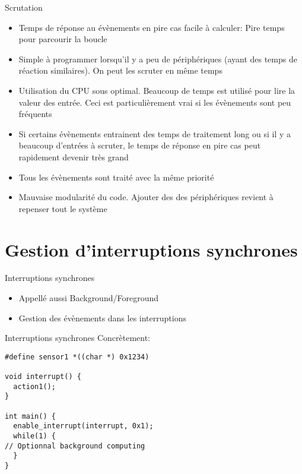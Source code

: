 \begin{frame}{Scrutation}
  \begin{itemize} 
  \item Temps de réponse au  évènements en pire cas facile à calculer:
    Pire temps pour parcourir la boucle
  \item Simple à programmer lorsqu'il  y a peu de périphériques (ayant
    des temps  de réaction  similaires). On peut  les scruter  en même
    temps
  \item Utilisation du CPU sous optimal. Beaucoup de temps est utilisé
    pour lire la valeur des  entrée. Ceci est particulièrement vrai si
    les évènements sont peu fréquents
  \item Si certains évènements entrainent des temps de traitement long
    ou si il y a beaucoup  d'entrées à scruter, le temps de réponse en
    pire cas peut rapidement devenir très grand
  \item Tous les évènements sont traité avec la même priorité
  \item  Mauvaise modularité  du code.  Ajouter des  des périphériques
    revient à repenser tout le système
  \end{itemize} 
\end{frame} 

\section{Gestion d'interruptions synchrones} 

\begin{frame}{Interruptions synchrones}
  \begin{itemize} 
  \item Appellé aussi Background/Foreground
  \item Gestion des évènements dans les interruptions
  \end{itemize} 
  \begin{center}
  \end{center}
\end{frame}

\begin{frame}[fragile]{Interruptions synchrones}
  Concrètement:
  \begin{lstlisting}
#define sensor1 *((char *) 0x1234)

void interrupt() {
  action1();
}

int main() {
  enable_interrupt(interrupt, 0x1);
  while(1) {
// Optionnal background computing 
  }
}
  \end{lstlisting} 
\end{frame}

